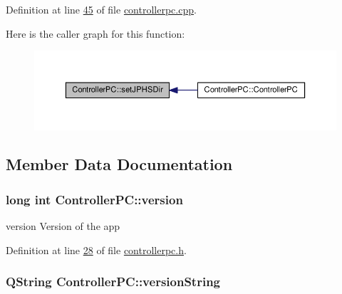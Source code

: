 Definition at line \hyperlink{controllerpc_8cpp_source_l00045}{45} of file \hyperlink{controllerpc_8cpp_source}{controllerpc.\+cpp}.



Here is the caller graph for this function\+:
\nopagebreak
\begin{figure}[H]
\begin{center}
\leavevmode
\includegraphics[width=350pt]{class_controller_p_c_ac00d29685a7e5b780c01eb438e10f96d_icgraph}
\end{center}
\end{figure}




\subsection{Member Data Documentation}
\subsubsection[{\texorpdfstring{version}{version}}]{\setlength{\rightskip}{0pt plus 5cm}long int Controller\+P\+C\+::version}\hypertarget{class_controller_p_c_a9eb43c34237d66751a6411e55cf5f55e}{}\label{class_controller_p_c_a9eb43c34237d66751a6411e55cf5f55e}


version Version of the app 



Definition at line \hyperlink{controllerpc_8h_source_l00028}{28} of file \hyperlink{controllerpc_8h_source}{controllerpc.\+h}.

\subsubsection[{\texorpdfstring{version\+String}{versionString}}]{\setlength{\rightskip}{0pt plus 5cm}Q\+String Controller\+P\+C\+::version\+String}\hypertarget{class_controller_p_c_a0e63cca37d6ce2e660f3380400c2c5f3}{}\label{class_controller_p_c_a0e63cca37d6ce2e660f3380400c2c5f3}


